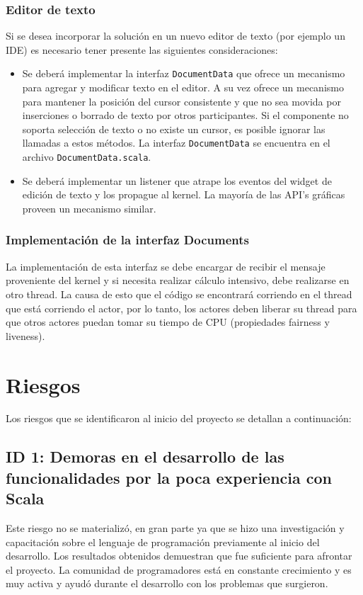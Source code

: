 \documentclass[12pt,a4paper]{article}
\let\stdsection\section
\renewcommand\section{\newpage\stdsection}
\begin{document}
\subsubsection{Editor de texto}
Si se desea incorporar la solución en un nuevo editor de texto (por ejemplo un IDE) es necesario tener presente 
las siguientes consideraciones:

	\begin{itemize}
		\item Se deberá implementar la interfaz \texttt{DocumentData} que ofrece un mecanismo para agregar y modificar texto en el editor. 
		A su vez ofrece un mecanismo para mantener la posición del cursor consistente y que no sea movida por inserciones o
		borrado de texto por otros participantes. Si el componente no soporta selección de texto o no existe un cursor, 
		es posible ignorar las llamadas a estos métodos.
		La interfaz \texttt{DocumentData} se encuentra en el archivo \texttt{DocumentData.scala}.
		\item  Se deberá implementar un listener que atrape los eventos del widget de edición de texto y los propague al kernel.
		La mayoría de las API’s gráficas proveen un mecanismo similar.
	\end{itemize}


\subsubsection{Implementación de la interfaz Documents}
La implementación de esta interfaz se debe encargar de recibir el mensaje proveniente del kernel y si necesita realizar
cálculo intensivo, debe realizarse en otro thread. La causa de esto que el código se encontrará corriendo en el thread que
está corriendo el actor, por lo tanto, los actores deben liberar su thread para que otros actores puedan tomar su tiempo de CPU
(propiedades fairness y liveness).

\section{Riesgos}

Los riesgos que se identificaron al inicio del proyecto se detallan a continuación:

\subsection{ID 1: Demoras en el desarrollo de las funcionalidades por la poca experiencia con Scala}
Este riesgo no se materializó, en gran parte ya que se hizo una investigación y capacitación sobre el lenguaje de
programación previamente al inicio del desarrollo. Los resultados obtenidos demuestran que fue suficiente
para afrontar el proyecto. La comunidad de programadores está en constante crecimiento y es muy activa y ayudó
durante el desarrollo con los problemas que surgieron.
\end{document}
